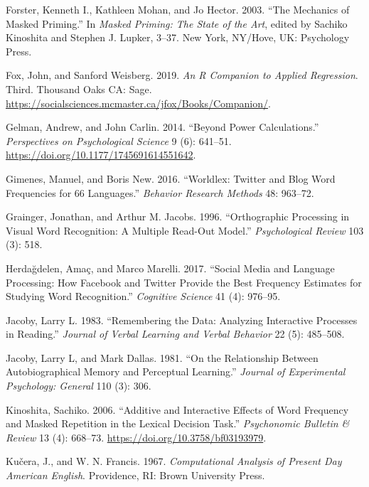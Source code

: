 \documentclass[
]{interact}
\newlength{\cslhangindent}
\newenvironment{CSLReferences}[2] %
 {\begin{list}{}{%
  \setlength{\itemindent}{0pt}
  \setlength{\leftmargin}{0pt}
  \setlength{\parsep}{0pt}
  \ifodd #1
   \setlength{\leftmargin}{\cslhangindent}
   \setlength{\itemindent}{-1\cslhangindent}
  \fi
  \setlength{\itemsep}{#2\baselineskip}}}
 {\end{list}}
\begin{document}
\begin{CSLReferences}{1}{0}
Forster, Kenneth I., Kathleen Mohan, and Jo Hector. 2003. {``The
Mechanics of Masked Priming.''} In \emph{Masked Priming: The State of
the Art}, edited by Sachiko Kinoshita and Stephen J. Lupker, 3--37. New
York, NY/Hove, UK: Psychology Press.

Fox, John, and Sanford Weisberg. 2019. \emph{An {R} Companion to Applied
Regression}. Third. Thousand Oaks {CA}: Sage.
\url{https://socialsciences.mcmaster.ca/jfox/Books/Companion/}.

Gelman, Andrew, and John Carlin. 2014. {``Beyond Power Calculations.''}
\emph{Perspectives on Psychological Science} 9 (6): 641--51.
\url{https://doi.org/10.1177/1745691614551642}.

Gimenes, Manuel, and Boris New. 2016. {``Worldlex: Twitter and Blog Word
Frequencies for 66 Languages.''} \emph{Behavior Research Methods} 48:
963--72.

Grainger, Jonathan, and Arthur M. Jacobs. 1996. {``Orthographic
Processing in Visual Word Recognition: A Multiple Read-Out Model.''}
\emph{Psychological Review} 103 (3): 518.

Herdağdelen, Amaç, and Marco Marelli. 2017. {``Social Media and Language
Processing: How Facebook and Twitter Provide the Best Frequency
Estimates for Studying Word Recognition.''} \emph{Cognitive Science} 41
(4): 976--95.

Jacoby, Larry L. 1983. {``Remembering the Data: Analyzing Interactive
Processes in Reading.''} \emph{Journal of Verbal Learning and Verbal
Behavior} 22 (5): 485--508.

Jacoby, Larry L, and Mark Dallas. 1981. {``On the Relationship Between
Autobiographical Memory and Perceptual Learning.''} \emph{Journal of
Experimental Psychology: General} 110 (3): 306.

Kinoshita, Sachiko. 2006. {``Additive and Interactive Effects of Word
Frequency and Masked Repetition in the Lexical Decision Task.''}
\emph{Psychonomic Bulletin \& Review} 13 (4): 668--73.
\url{https://doi.org/10.3758/bf03193979}.

Kučera, J., and W. N. Francis. 1967. \emph{Computational Analysis of
Present Day American English}. Providence, RI: Brown University Press.


\end{CSLReferences}
\end{document}
